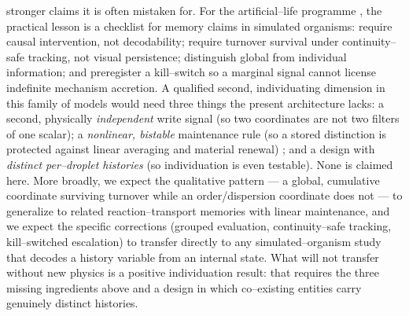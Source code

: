\documentclass[11pt]{article}
\begin{document}
stronger claims it is often mistaken for. For the artificial--life programme \citep{bedau2000}, the practical lesson is a checklist for memory claims in simulated organisms: require causal intervention, not decodability; require turnover survival under continuity--safe tracking, not visual persistence; distinguish global from individual information; and preregister a kill--switch so a marginal signal cannot license indefinite mechanism accretion. A qualified second, individuating dimension in this family of models would need three things the present architecture lacks: a second, physically \emph{independent} write signal (so two coordinates are not two filters of one scalar); a \emph{nonlinear, bistable} maintenance rule (so a stored distinction is protected against linear averaging and material renewal) \citep{gardner2000,ferrell2002}; and a design with \emph{distinct per--droplet histories} (so individuation is even testable). None is claimed here. More broadly, we expect the qualitative pattern --- a global, cumulative coordinate surviving turnover while an order/dispersion coordinate does not --- to generalize to related reaction--transport memories with linear maintenance, and we expect the specific corrections (grouped evaluation, continuity--safe tracking, kill--switched escalation) to transfer directly to any simulated--organism study that decodes a history variable from an internal state. What will not transfer without new physics is a positive individuation result: that requires the three missing ingredients above and a design in which co--existing entities carry genuinely distinct histories.
\end{document}

